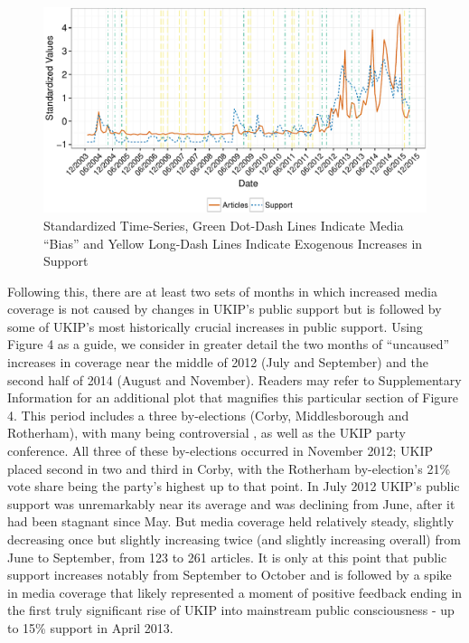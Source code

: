 \documentclass[12pt,]{article}
\makeatletter
\def\maxwidth{\ifdim\Gin@nat@width>\linewidth\linewidth
\else\Gin@nat@width\fi}
\let\Oldincludegraphics\includegraphics
\renewcommand{\includegraphics}[1]{\Oldincludegraphics[width=\maxwidth]{#1}}
\makeatother
\begin{document}
\begin{figure}[htbp]
\centering
\includegraphics{ukip_media_files/figure-latex/unnamed-chunk-9-1.pdf}
\caption{Standardized Time-Series, Green Dot-Dash Lines Indicate Media
``Bias'' and Yellow Long-Dash Lines Indicate Exogenous Increases in
Support}
\end{figure}

Following this, there are at least two sets of months in which increased
media coverage is not caused by changes in UKIP's public support but is
followed by some of UKIP's most historically crucial increases in public
support. Using Figure 4 as a guide, we consider in greater detail the
two months of ``uncaused'' increases in coverage near the middle of 2012
(July and September) and the second half of 2014 (August and November).
Readers may refer to Supplementary Information for an additional plot
that magnifies this particular section of Figure 4. This period includes
a three by-elections (Corby, Middlesborough and Rotherham), with many
being controversial \citep{wainwright_rotherham_2012}, as well as the
UKIP party conference. All three of these by-elections occurred in
November 2012; UKIP placed second in two and third in Corby, with the
Rotherham by-election's 21\% vote share being the party's highest up to
that point. In July 2012 UKIP's public support was unremarkably near its
average and was declining from June, after it had been stagnant since
May. But media coverage held relatively steady, slightly decreasing once
but slightly increasing twice (and slightly increasing overall) from
June to September, from 123 to 261 articles. It is only at this point
that public support increases notably from September to October and is
followed by a spike in media coverage that likely represented a moment
of positive feedback ending in the first truly significant rise of UKIP
into mainstream public consciousness - up to 15\% support in April 2013.
\end{document}
